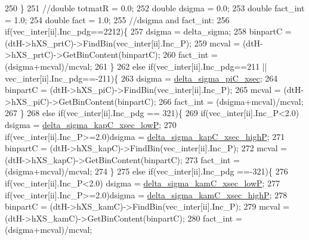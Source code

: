 \begin{DoxyCode}
250         \}
251         \textcolor{comment}{//double totmatR  = 0.0;}
252         \textcolor{keywordtype}{double} dsigma   = 0.0;
253         \textcolor{keywordtype}{double} fact\_int = 1.0;  
254         \textcolor{keywordtype}{double} fact     = 1.0;  
255         \textcolor{comment}{//dsigma and fact\_int:}
256         \textcolor{keywordflow}{if}(vec\_inter[ii].Inc\_pdg==2212)\{
257           dsigma   = delta\_sigma;
258           binpartC = (dtH->hXS\_prtC)->FindBin(vec\_inter[ii].Inc\_P);
259           mcval    = (dtH->hXS\_prtC)->GetBinContent(binpartC);
260           fact\_int = (dsigma+mcval)/mcval;
261         \}
262         \textcolor{keywordflow}{else} \textcolor{keywordflow}{if}(vec\_inter[ii].Inc\_pdg==211 || vec\_inter[ii].Inc\_pdg==-211)\{
263           dsigma   = \hyperlink{class_neutrino_flux_reweight_1_1_target_attenuation_reweighter_afe869ddec31e4710192f0a990b78c7b6}{delta\_sigma\_piC\_xsec};
264           binpartC = (dtH->hXS\_piC)->FindBin(vec\_inter[ii].Inc\_P);
265           mcval    = (dtH->hXS\_piC)->GetBinContent(binpartC);
266           fact\_int = (dsigma+mcval)/mcval;
267         \}
268         \textcolor{keywordflow}{else} \textcolor{keywordflow}{if}(vec\_inter[ii].Inc\_pdg == 321)\{
269           \textcolor{keywordflow}{if}(vec\_inter[ii].Inc\_P<2.0) dsigma = \hyperlink{class_neutrino_flux_reweight_1_1_target_attenuation_reweighter_abcfaf35e7861c941eb17a22a9fdc867d}{delta\_sigma\_kapC\_xsec\_lowP};
270           \textcolor{keywordflow}{if}(vec\_inter[ii].Inc\_P>=2.0)dsigma = \hyperlink{class_neutrino_flux_reweight_1_1_target_attenuation_reweighter_a1da8f3585af2ed5e282e6f2cd7e613f9}{delta\_sigma\_kapC\_xsec\_highP};
271           binpartC = (dtH->hXS\_kapC)->FindBin(vec\_inter[ii].Inc\_P);
272           mcval    = (dtH->hXS\_kapC)->GetBinContent(binpartC);
273           fact\_int = (dsigma+mcval)/mcval;
274         \}
275         \textcolor{keywordflow}{else} \textcolor{keywordflow}{if}(vec\_inter[ii].Inc\_pdg ==-321)\{
276           \textcolor{keywordflow}{if}(vec\_inter[ii].Inc\_P<2.0) dsigma = \hyperlink{class_neutrino_flux_reweight_1_1_target_attenuation_reweighter_a83c1ebd3f9ce871a6aeefb52f9fd1dbc}{delta\_sigma\_kamC\_xsec\_lowP};
277           \textcolor{keywordflow}{if}(vec\_inter[ii].Inc\_P>=2.0)dsigma = \hyperlink{class_neutrino_flux_reweight_1_1_target_attenuation_reweighter_a95594f470ba874e6497c656e73de5af0}{delta\_sigma\_kamC\_xsec\_highP};
278           binpartC = (dtH->hXS\_kamC)->FindBin(vec\_inter[ii].Inc\_P);
279           mcval    = (dtH->hXS\_kamC)->GetBinContent(binpartC);
280           fact\_int = (dsigma+mcval)/mcval;

\end{DoxyCode}
